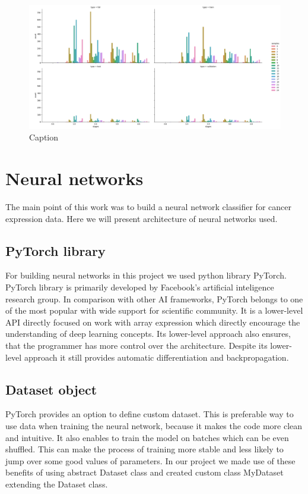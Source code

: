 \begin{figure}
    \centering
    \includegraphics[width=\linewidth]{images/split_all.png}
    \caption{Caption}
    \label{fig:split_all}
\end{figure}

\section{Neural networks}
The main point of this work was to build a neural network classifier for cancer expression data.
Here we will present architecture of neural networks used.

\subsection{PyTorch library}
For building neural networks in this project we used python library PyTorch.
PyTorch library is primarily developed by Facebook's artificial inteligence research group. \cite{pytorch}
In comparison with other AI frameworks, PyTorch belongs to one of the most popular with wide support for scientific community.
It is a lower-level API directly focused on work with array expression which directly encourage the understanding of deep learning concepts.
Its lower-level approach also ensures, that the programmer has more control over the architecture.
Despite its lower-level approach it still provides automatic differentiation and backpropagation.

\subsection{Dataset object}
PyTorch provides an option to define custom dataset.
This is preferable way to use data when training the neural network, because it makes the code more clean and intuitive.
It also enables to train the model on batches which can be even shuffled.
This can make the process of training more stable and less likely to jump over some good values of parameters.
In our project we made use of these benefits of using abstract Dataset class and created custom class MyDataset extending the Dataset class.

